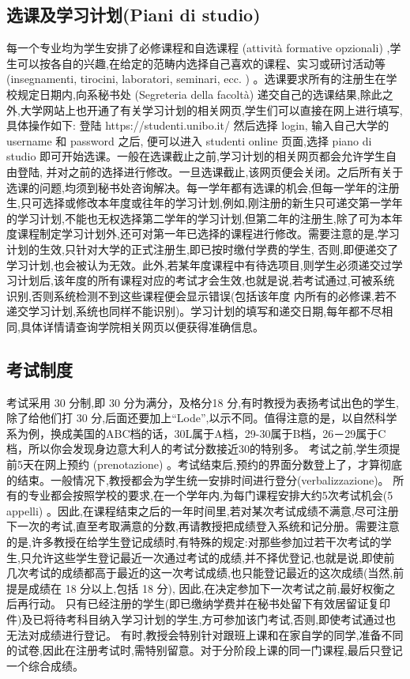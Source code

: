 \subsection{选课及学习计划(Piani di studio)}
每一个专业均为学生安排了必修课程和自选课程 (attività formative opzionali) ,学生可以按各自的兴趣,在给定的范畴内选择自己喜欢的课程、实习或研讨活动等(insegnamenti, tirocini, laboratori, seminari, ecc. ) 。选课要求所有的注册生在学校规定日期内,向系秘书处 (Segreteria della facoltà) 递交自己的选课结果,除此之外,大学网站上也开通了有关学习计划的相关网页,学生们可以直接在网上进行填写,具体操作如下: 登陆 https://studenti.unibo.it/ 然后选择 login, 输入自己大学的 username 和 password 之后, 便可以进入 studenti online 页面,选择 piano di studio 即可开始选课。一般在选课截止之前,学习计划的相关网页都会允许学生自由登陆, 并对之前的选择进行修改。一旦选课截止,该网页便会关闭。之后所有关于选课的问题,均须到秘书处咨询解决。每一学年都有选课的机会,但每一学年的注册生,只可选择或修改本年度或往年的学习计划,例如,刚注册的新生只可递交第一学年的学习计划,不能也无权选择第二学年的学习计划,但第二年的注册生,除了可为本年度课程制定学习计划外,还可对第一年已选择的课程进行修改。需要注意的是,学习计划的生效,只针对大学的正式注册生,即已按时缴付学费的学生, 否则,即便递交了学习计划,也会被认为无效。此外,若某年度课程中有待选项目,则学生必须递交过学习计划后,该年度的所有课程对应的考试才会生效,也就是说,若考试通过,可被系统识别,否则系统检测不到这些课程便会显示错误(包括该年度 内所有的必修课,若不递交学习计划,系统也同样不能识别)。学习计划的填写和递交日期,每年都不尽相同,具体详情请查询学院相关网页以便获得准确信息。 

\subsection{考试制度}
考试采用 30 分制,即 30 分为满分，及格分18 分,有时教授为表扬考试出色的学生,除了给他们打 30 分,后面还要加上“Lode”,以示不同。值得注意的是，以自然科学系为例，换成美国的ABC档的话，30L属于A档，29-30属于B档，26－29属于C档，所以你会发现身边意大利人的考试分数接近30的特别多。
考试之前,学生须提前5天在网上预约 (prenotazione) 。考试结束后,预约的界面分数登上了，才算彻底的结束。一般情况下,教授都会为学生统一安排时间进行登分(verbalizzazione)。
所有的专业都会按照学校的要求,在一个学年内,为每门课程安排大约5次考试机会(5 appelli) 。因此,在课程结束之后的一年时间里,若对某次考试成绩不满意,尽可注册下一次的考试,直至考取满意的分数,再请教授把成绩登入系统和记分册。需要注意的是,许多教授在给学生登记成绩时,有特殊的规定:对那些参加过若干次考试的学生,只允许这些学生登记最近一次通过考试的成绩,并不择优登记,也就是说,即使前几次考试的成绩都高于最近的这一次考试成绩,也只能登记最近的这次成绩(当然,前提是成绩在 18 分以上,包括 18 分), 因此,在决定参加下一次考试之前,最好权衡之后再行动。 只有已经注册的学生(即已缴纳学费并在秘书处留下有效居留证复印件)及已将待考科目纳入学习计划的学生,方可参加该门考试,否则,即使考试通过也无法对成绩进行登记。 
有时,教授会特别针对跟班上课和在家自学的同学,准备不同的试卷,因此在注册考试时,需特别留意。对于分阶段上课的同一门课程,最后只登记一个综合成绩。

